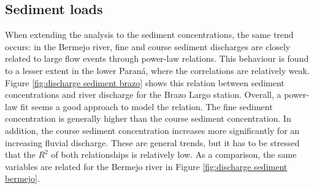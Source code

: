 \subsection{Sediment loads}
When extending the analysis to the sediment concentrations, the same trend occurs: in the Bermejo river, fine and course sediment discharges are closely related to large flow events through power-law relations. This behaviour is found to a lesser extent in the lower Paraná, where the correlations are relatively weak. Figure \ref{fig:discharge sediment brazo} shows this relation between sediment concentrations and river discharge for the Brazo Largo station. Overall, a power-law fit seems a good approach to model the relation. The fine sediment concentration is generally higher than the course sediment concentration. In addition, the course sediment concentration increases more significantly for an increasing fluvial discharge. These are general trends, but it has to be stressed that the $R^2$ of both relationships is relatively low. As a comparison, the same variables are related for the Bermejo river in Figure \ref{fig:discharge sediment bermejo}. 


